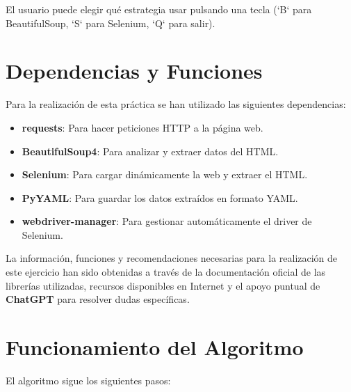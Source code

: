 \documentclass[a4paper,12pt]{article}
\begin{document}
El usuario puede elegir qué estrategia usar pulsando una tecla (`B` para BeautifulSoup, `S` para Selenium, `Q` para salir).

\section{Dependencias y Funciones}
Para la realización de esta práctica se han utilizado las siguientes dependencias:

\begin{itemize}
    \item \textbf{requests}: Para hacer peticiones HTTP a la página web.
    \item \textbf{BeautifulSoup4}: Para analizar y extraer datos del HTML.
    \item \textbf{Selenium}: Para cargar dinámicamente la web y extraer el HTML.
    \item \textbf{PyYAML}: Para guardar los datos extraídos en formato YAML.
    \item \textbf{webdriver-manager}: Para gestionar automáticamente el driver de Selenium.
\end{itemize}

La información, funciones y recomendaciones necesarias para la realización de este ejercicio han sido obtenidas a través de la documentación oficial de las librerías utilizadas, recursos disponibles en Internet y el apoyo puntual de \textbf{ChatGPT} para resolver dudas específicas.

\section{Funcionamiento del Algoritmo}
El algoritmo sigue los siguientes pasos:
\end{document}
